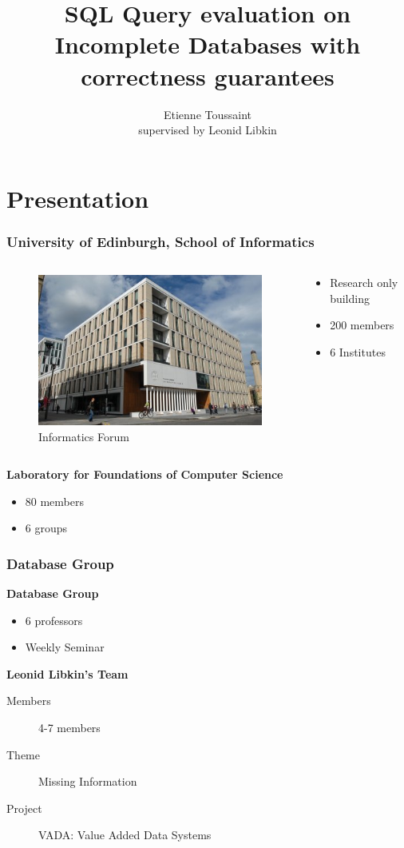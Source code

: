 \documentclass{beamer}
\title[SQL Query evaluation with correctness guarantees]{SQL Query evaluation on Incomplete Databases with correctness guarantees}
\author[Etienne Toussaint]{Etienne Toussaint \\ supervised by Leonid Libkin}\institute{ENS Paris-Saclay, The University of Edinburgh}
\begin{document}
	
\section{Presentation}
	\begin{frame}
		\titlepage
	\end{frame}
	
	\begin{frame}
			\frametitle{University of Edinburgh, School of Informatics}
			\begin{columns}
				\begin{column}{0.48\textwidth}
					\begin{figure}
							\includegraphics[scale=1.5]{forum}
							\caption{Informatics Forum}
					\end{figure}
				\end{column}
				\begin{column}{0.48\textwidth}
					\begin{itemize}
						\item Research only building
						\item 200 members
						\item 6 Institutes
					\end{itemize}
				\end{column}
			\end{columns}
			\pause
		\textbf{Laboratory for Foundations of Computer Science}
		\begin{itemize}
			\item 80 members
			\item 6 groups
		\end{itemize}
	\end{frame}
	
	\begin{frame}
		\frametitle{Database Group}
		\textbf{Database Group}
		\begin{itemize}
			\item 6 professors
			\item Weekly Seminar
		\end{itemize}
		\pause
		\bigskip
		
		\textbf{Leonid Libkin's Team}
	\begin{description}
		\item[Members] 4-7 members
		\item[Theme] Missing Information
		\item[Project] VADA: Value Added Data Systems
	\end{description}
	\end{frame}
	
\end{document}
